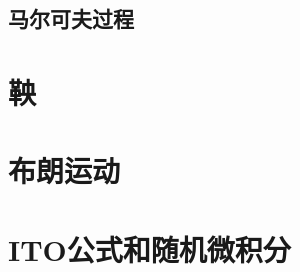 \documentclass[lang=cn,10pt]{elegantbook}
\begin{document}
	
	
	\section{马尔可夫过程}



	\chapter{鞅}
	\chapter{布朗运动}
	\chapter{ITO公式和随机微积分}
	
\end{document}

